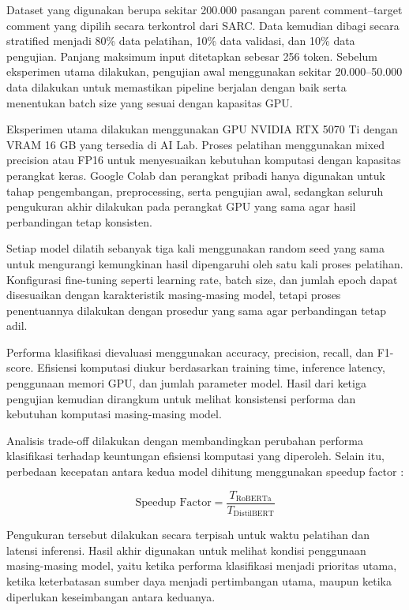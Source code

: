 Dataset yang digunakan berupa sekitar 200.000 pasangan parent comment–target comment yang dipilih secara terkontrol dari SARC. Data kemudian dibagi secara stratified menjadi 80\% data pelatihan, 10\% data validasi, dan 10\% data pengujian. Panjang maksimum input ditetapkan sebesar 256 token. Sebelum eksperimen utama dilakukan, pengujian awal menggunakan sekitar 20.000–50.000 data dilakukan untuk memastikan pipeline berjalan dengan baik serta menentukan batch size yang sesuai dengan kapasitas GPU.

Eksperimen utama dilakukan menggunakan GPU NVIDIA RTX 5070 Ti dengan VRAM 16 GB yang tersedia di AI Lab. Proses pelatihan menggunakan mixed precision atau FP16 untuk menyesuaikan kebutuhan komputasi dengan kapasitas perangkat keras. Google Colab dan perangkat pribadi hanya digunakan untuk tahap pengembangan, preprocessing, serta pengujian awal, sedangkan seluruh pengukuran akhir dilakukan pada perangkat GPU yang sama agar hasil perbandingan tetap konsisten.

Setiap model dilatih sebanyak tiga kali menggunakan random seed yang sama untuk mengurangi kemungkinan hasil dipengaruhi oleh satu kali proses pelatihan. Konfigurasi fine-tuning seperti learning rate, batch size, dan jumlah epoch dapat disesuaikan dengan karakteristik masing-masing model, tetapi proses penentuannya dilakukan dengan prosedur yang sama agar perbandingan tetap adil.

Performa klasifikasi dievaluasi menggunakan accuracy, precision, recall, dan F1-score. Efisiensi komputasi diukur berdasarkan training time, inference latency, penggunaan memori GPU, dan jumlah parameter model. Hasil dari ketiga pengujian kemudian dirangkum untuk melihat konsistensi performa dan kebutuhan komputasi masing-masing model.

Analisis trade-off dilakukan dengan membandingkan perubahan performa klasifikasi terhadap keuntungan efisiensi komputasi yang diperoleh. Selain itu, perbedaan kecepatan antara kedua model dihitung menggunakan speedup factor \cite{dubey2025unpacking}:

\[
\text{Speedup Factor} =
\frac{T_{\text{RoBERTa}}}{T_{\text{DistilBERT}}}
\]

Pengukuran tersebut dilakukan secara terpisah untuk waktu pelatihan dan latensi inferensi. Hasil akhir digunakan untuk melihat kondisi penggunaan masing-masing model, yaitu ketika performa klasifikasi menjadi prioritas utama, ketika keterbatasan sumber daya menjadi pertimbangan utama, maupun ketika diperlukan keseimbangan antara keduanya.

